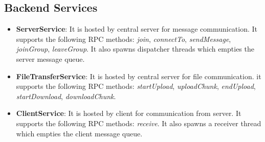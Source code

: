 \documentclass[a4paper,10pt]{article}
\begin{document}
\subsection{Backend Services}
\begin{itemize}
    \item \textbf{ServerService}: It is hosted by central server for message communication. It supports the following RPC methods: \textit{join}, \textit{connectTo}, \textit{sendMessage}, \textit{joinGroup}, \textit{leaveGroup}. It also spawns dispatcher threads which empties the server message queue.
    \item \textbf{FileTransferService}: It is hosted by central server for file communication. it supports the following RPC methods: \textit{startUpload}, \textit{uploadChunk}, \textit{endUpload}, \textit{startDownload}, \textit{downloadChunk}.
    \item \textbf{ClientService}: It is hosted by client for communication from server. It supports the following RPC methods: \textit{receive}. It also spawns a receiver thread which empties the client message queue.
\end{itemize}
\end{document}
